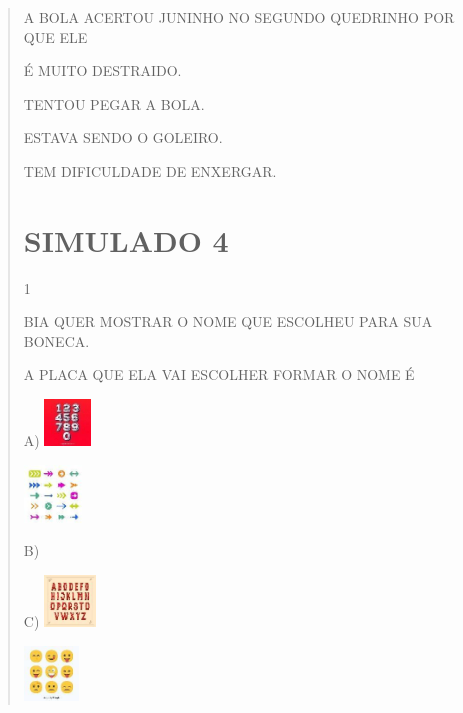 \begin{escola}
{\begin{verse}
A BOLA ACERTOU JUNINHO NO SEGUNDO QUEDRINHO POR QUE ELE

\begin{escolha}
\item É MUITO DESTRAIDO.

\item TENTOU PEGAR A BOLA.

\item ESTAVA SENDO O GOLEIRO.

\item TEM DIFICULDADE DE ENXERGAR.
\end{escolha}


\chapter{SIMULADO 4}

\num{1}

BIA QUER MOSTRAR O NOME QUE ESCOLHEU PARA SUA BONECA.

A PLACA QUE ELA VAI ESCOLHER FORMAR O NOME É

A)
\includegraphics[width=0.48889in,height=0.48889in]{media/image239.jpg}

\includegraphics[width=0.60625in,height=0.60625in]{media/image240.jpg}

B)

C)
\includegraphics[width=0.54236in,height=0.54236in]{media/image241.jpg}

\includegraphics[width=0.57431in,height=0.57431in]{media/image242.jpg}


\end{verse}}
\end{escola}
